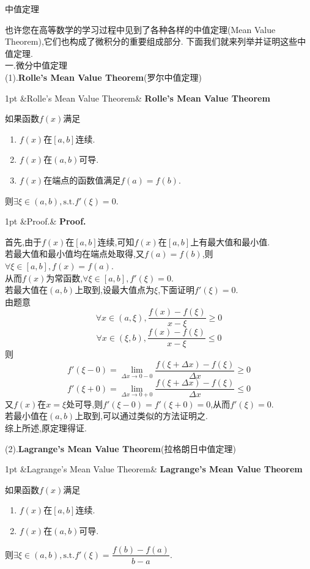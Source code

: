 \documentclass{ctexart}
\newcommand{\st}{,\text{s.t.}}
\newenvironment{formal}[1][]{%
\def\FrameCommand{%
\hspace{1pt}%
{\color{DarkBlue}\vrule width 2pt}%
{\color{formalshade}\vrule width 4pt}%
\colorbox{formalshade}%
}%
\MakeFramed{\advance\hsize-\width\FrameRestore}%
\noindent\hspace{-4.55pt}%
\begin{adjustwidth}{}{1pt}%
\setlength{\parindent}{0pt}%
\vspace{3pt}%
\ifx&#1&\else %
    \textbf{#1}\par\vspace{1pt}%
\fi
}
{%
\vspace{2pt}%
\end{adjustwidth}\endMakeFramed%
}
\newenvironment{solution}[1][]{%
\def\FrameCommand{%
\hspace{1pt}%
{\color{solutionline}\vrule width 2pt}%
{\color{solutionshade}\vrule width 4pt}%
\colorbox{solutionshade}%
}%
\MakeFramed{\advance\hsize-\width\FrameRestore}%
\noindent\hspace{-4.55pt}%
\begin{adjustwidth}{}{1pt}%
\setlength{\parindent}{0pt}%
\vspace{3pt}%
\ifx&#1&\else %
    \textbf{#1}\par\vspace{1pt}%
\fi
}
{%
\vspace{2pt}%
\end{adjustwidth}\endMakeFramed%
}
\begin{document}
\pagestyle{empty}
\begin{center}\large 中值定理\end{center}
也许您在高等数学的学习过程中见到了各种各样的中值定理(Mean Value Theorem),它们也构成了微积分的重要组成部分.
下面我们就来列举并证明这些中值定理.\\
一.微分中值定理\\
(1).\textbf{Rolle's Mean Value Theorem}(罗尔中值定理)
\begin{formal}[Rolle's Mean Value Theorem]
    如果函数$f(x)$满足
    \begin{enumerate}[leftmargin=*,label=(\alph*)]
        \item $f(x)$在$[a,b]$连续.
        \item $f(x)$在$(a,b)$可导.
        \item $f(x)$在端点的函数值满足$f(a)=f(b)$.
    \end{enumerate}
    则$\exists\xi\in(a,b)\st f'(\xi)=0.$
\end{formal}
\begin{solution}[Proof.]
    首先,由于$f(x)$在$[a,b]$连续,可知$f(x)$在$[a,b]$上有最大值和最小值.\\
    若最大值和最小值均在端点处取得,又$f(a)=f(b)$,则$\forall \xi\in[a,b],f(x)=f(a)$.\\
    从而$f(x)$为常函数,$\forall\xi\in[a,b],f'(\xi)=0$.\\
    若最大值在$(a,b)$上取到,设最大值点为$\xi$,下面证明$f'(\xi)=0$.\\
    由题意$$\forall x\in(a,\xi),\dfrac{f(x)-f(\xi)}{x-\xi}\geqslant 0$$
    $$\forall x\in(\xi,b),\dfrac{f(x)-f(\xi)}{x-\xi}\leqslant 0$$
    则$$f'(\xi-0)=\lim_{\Delta x\to 0-0}{\dfrac{f(\xi+\Delta x)-f(\xi)}{\Delta x}}\geqslant 0$$
    $$f'(\xi+0)=\lim_{\Delta x\to 0+0}{\dfrac{f(\xi+\Delta x)-f(\xi)}{\Delta x}}\leqslant 0$$
    又$f(x)$在$x=\xi$处可导,则$f'(\xi-0)=f'(\xi+0)=0$,从而$f'(\xi)=0$.\\
    若最小值在$(a,b)$上取到,可以通过类似的方法证明之.\\
    综上所述,原定理得证.
\end{solution}\noindent
(2).\textbf{Lagrange's Mean Value Theorem}(拉格朗日中值定理)
\begin{formal}[Lagrange's Mean Value Theorem]
    如果函数$f(x)$满足
    \begin{enumerate}[leftmargin=*,label=(\alph*)]
        \item $f(x)$在$[a,b]$连续.
        \item $f(x)$在$(a,b)$可导.
    \end{enumerate}
    则$\exists\xi\in(a,b)\st f'(\xi)=\dfrac{f(b)-f(a)}{b-a}.$
\end{formal}
\end{document}
